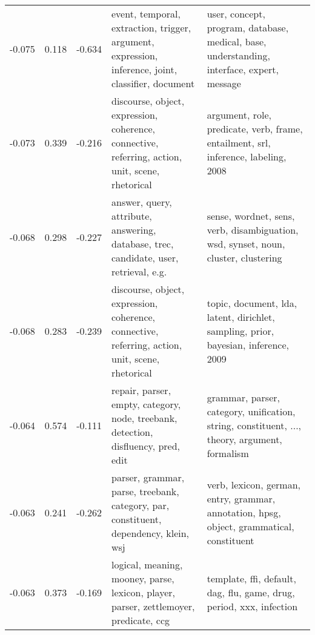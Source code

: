 \begin{tabular}{cccp{5cm}p{5cm}}
-0.075 & 0.118 & -0.634 & event, temporal, extraction, trigger, argument, expression, inference, joint, classifier, document & user, concept, program, database, medical, base, understanding, interface, expert, message \\
-0.073 & 0.339 & -0.216 & discourse, object, expression, coherence, connective, referring, action, unit, scene, rhetorical & argument, role, predicate, verb, frame, entailment, srl, inference, labeling, 2008 \\
-0.068 & 0.298 & -0.227 & answer, query, attribute, answering, database, trec, candidate, user, retrieval, e.g. & sense, wordnet, sens, verb, disambiguation, wsd, synset, noun, cluster, clustering \\
-0.068 & 0.283 & -0.239 & discourse, object, expression, coherence, connective, referring, action, unit, scene, rhetorical & topic, document, lda, latent, dirichlet, sampling, prior, bayesian, inference, 2009 \\
-0.064 & 0.574 & -0.111 & repair, parser, empty, category, node, treebank, detection, disfluency, pred, edit & grammar, parser, category, unification, string, constituent, ..., theory, argument, formalism \\
-0.063 & 0.241 & -0.262 & parser, grammar, parse, treebank, category, par, constituent, dependency, klein, wsj & verb, lexicon, german, entry, grammar, annotation, hpsg, object, grammatical, constituent \\
-0.063 & 0.373 & -0.169 & logical, meaning, mooney, parse, lexicon, player, parser, zettlemoyer, predicate, ccg & template, ffi, default, dag, flu, game, drug, period, xxx, infection \\
\bottomrule
\end{tabular}
